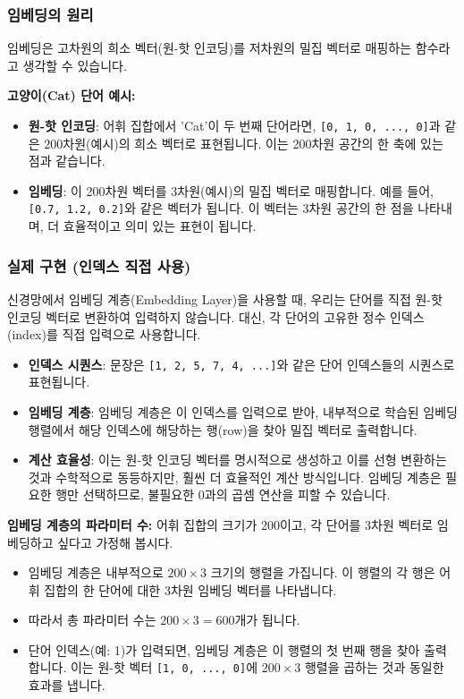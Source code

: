 \documentclass[11pt,a4paper]{article}
\begin{document}
\subsubsection{임베딩의 원리}
임베딩은 고차원의 희소 벡터(원-핫 인코딩)를 저차원의 밀집 벡터로 매핑하는 함수라고 생각할 수 있습니다.

\begin{examplebox}
\textbf{고양이(Cat) 단어 예시:}
\begin{itemize}
    \item \textbf{원-핫 인코딩}: 어휘 집합에서 'Cat'이 두 번째 단어라면, \texttt{[0, 1, 0, ..., 0]}과 같은 200차원(예시)의 희소 벡터로 표현됩니다. 이는 200차원 공간의 한 축에 있는 점과 같습니다.
    \item \textbf{임베딩}: 이 200차원 벡터를 3차원(예시)의 밀집 벡터로 매핑합니다. 예를 들어, \texttt{[0.7, 1.2, 0.2]}와 같은 벡터가 됩니다. 이 벡터는 3차원 공간의 한 점을 나타내며, 더 효율적이고 의미 있는 표현이 됩니다.
\end{itemize}
\end{examplebox}

\subsubsection{실제 구현 (인덱스 직접 사용)}
신경망에서 임베딩 계층(Embedding Layer)을 사용할 때, 우리는 단어를 직접 원-핫 인코딩 벡터로 변환하여 입력하지 않습니다. 대신, 각 단어의 고유한 정수 인덱스(index)를 직접 입력으로 사용합니다.

\begin{itemize}
    \item \textbf{인덱스 시퀀스}: 문장은 \texttt{[1, 2, 5, 7, 4, ...]}와 같은 단어 인덱스들의 시퀀스로 표현됩니다.
    \item \textbf{임베딩 계층}: 임베딩 계층은 이 인덱스를 입력으로 받아, 내부적으로 학습된 임베딩 행렬에서 해당 인덱스에 해당하는 행(row)을 찾아 밀집 벡터로 출력합니다.
    \item \textbf{계산 효율성}: 이는 원-핫 인코딩 벡터를 명시적으로 생성하고 이를 선형 변환하는 것과 수학적으로 동등하지만, 훨씬 더 효율적인 계산 방식입니다. 임베딩 계층은 필요한 행만 선택하므로, 불필요한 0과의 곱셈 연산을 피할 수 있습니다.
\end{itemize}

\begin{examplebox}
\textbf{임베딩 계층의 파라미터 수:}
어휘 집합의 크기가 200이고, 각 단어를 3차원 벡터로 임베딩하고 싶다고 가정해 봅시다.
\begin{itemize}
    \item 임베딩 계층은 내부적으로 $200 \times 3$ 크기의 행렬을 가집니다. 이 행렬의 각 행은 어휘 집합의 한 단어에 대한 3차원 임베딩 벡터를 나타냅니다.
    \item 따라서 총 파라미터 수는 $200 \times 3 = 600$개가 됩니다.
    \item 단어 인덱스(예: 1)가 입력되면, 임베딩 계층은 이 행렬의 첫 번째 행을 찾아 출력합니다. 이는 원-핫 벡터 \texttt{[1, 0, ..., 0]}에 $200 \times 3$ 행렬을 곱하는 것과 동일한 효과를 냅니다.
\end{itemize}
\end{examplebox}
\end{document}

